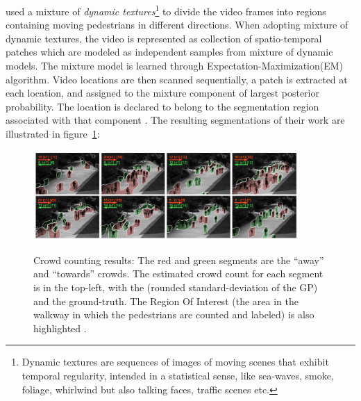\citeauthor*{chan2008privacy} used a mixture of \textit{dynamic textures}\footnote{Dynamic textures are sequences of images of moving scenes that exhibit temporal regularity, intended in a statistical sense, like sea-waves, smoke, foliage, whirlwind but also talking faces, traffic scenes etc.} to divide the video frames into regions containing moving pedestrians in different directions. When adopting mixture of dynamic textures, the video is represented as collection of spatio-temporal patches which are modeled as independent samples from mixture of dynamic models. The mixture model is learned through Expectation-Maximization(EM) algorithm. Video locations are then scanned sequentially, a patch is extracted at each location, and assigned to the mixture component of largest posterior probability. The location is declared to belong to the segmentation region associated with that component  \cite{chan2008privacy}. The resulting segmentations of their work are illustrated in figure~\ref{fig:segUcsd}:
\begin{figure}[H]
	\centering
	{\includegraphics[width=0.9\textwidth]{images/segUcsd}}
	\caption{Crowd counting results: The red and green segments are the “away” and “towards” crowds. The estimated crowd count for each segment is in the top-left, with the (rounded standard-deviation of the GP) and the ground-truth. The Region Of Interest (the area in the walkway in which the pedestrians are counted and labeled) is also highlighted \cite{chan2008privacy}.}
	\label{fig:segUcsd}
\end{figure}

